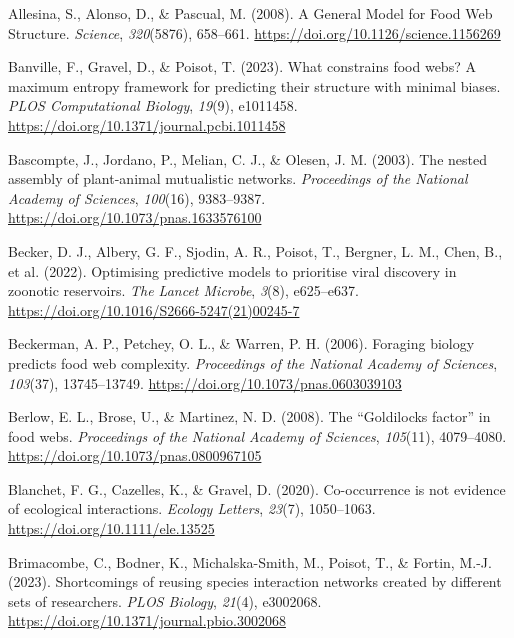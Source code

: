 \documentclass[
]{agujournal2019}
\newlength{\cslhangindent}
\newenvironment{CSLReferences}[2] %
 {\begin{list}{}{%
  \setlength{\itemindent}{0pt}
  \setlength{\leftmargin}{0pt}
  \setlength{\parsep}{0pt}
  \ifodd #1
   \setlength{\leftmargin}{\cslhangindent}
   \setlength{\itemindent}{-1\cslhangindent}
  \fi
  \setlength{\itemsep}{#2\baselineskip}}}
 {\end{list}}
\begin{document}
\label{refs}
\begin{CSLReferences}{1}{0}
Allesina, S., Alonso, D., \& Pascual, M. (2008). A {General Model} for
{Food Web Structure}. \emph{Science}, \emph{320}(5876), 658--661.
\url{https://doi.org/10.1126/science.1156269}

Banville, F., Gravel, D., \& Poisot, T. (2023). What constrains food
webs? {A} maximum entropy framework for predicting their structure with
minimal biases. \emph{PLOS Computational Biology}, \emph{19}(9),
e1011458. \url{https://doi.org/10.1371/journal.pcbi.1011458}

Bascompte, J., Jordano, P., Melian, C. J., \& Olesen, J. M. (2003). The
nested assembly of plant-animal mutualistic networks. \emph{Proceedings
of the National Academy of Sciences}, \emph{100}(16), 9383--9387.
\url{https://doi.org/10.1073/pnas.1633576100}

Becker, D. J., Albery, G. F., Sjodin, A. R., Poisot, T., Bergner, L. M.,
Chen, B., et al. (2022). Optimising predictive models to prioritise
viral discovery in zoonotic reservoirs. \emph{The Lancet Microbe},
\emph{3}(8), e625--e637.
\url{https://doi.org/10.1016/S2666-5247(21)00245-7}

Beckerman, A. P., Petchey, O. L., \& Warren, P. H. (2006). Foraging
biology predicts food web complexity. \emph{Proceedings of the National
Academy of Sciences}, \emph{103}(37), 13745--13749.
\url{https://doi.org/10.1073/pnas.0603039103}

Berlow, E. L., Brose, U., \& Martinez, N. D. (2008). The {``{Goldilocks}
factor''} in food webs. \emph{Proceedings of the National Academy of
Sciences}, \emph{105}(11), 4079--4080.
\url{https://doi.org/10.1073/pnas.0800967105}

Blanchet, F. G., Cazelles, K., \& Gravel, D. (2020). Co-occurrence is
not evidence of ecological interactions. \emph{Ecology Letters},
\emph{23}(7), 1050--1063. \url{https://doi.org/10.1111/ele.13525}

Brimacombe, C., Bodner, K., Michalska-Smith, M., Poisot, T., \& Fortin,
M.-J. (2023). Shortcomings of reusing species interaction networks
created by different sets of researchers. \emph{PLOS Biology},
\emph{21}(4), e3002068.
\url{https://doi.org/10.1371/journal.pbio.3002068}


\end{CSLReferences}
\end{document}
